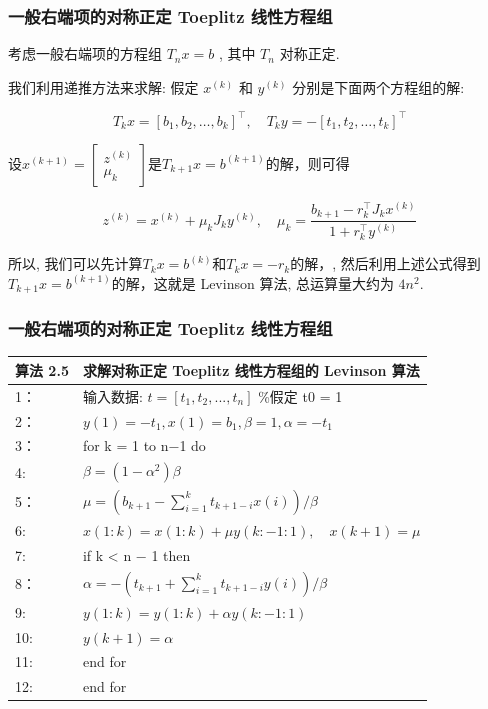 \documentclass[notheorems,serif]{beamer}
\begin{document}
\begin{frame}
\frametitle{一般右端项的对称正定 Toeplitz 线性方程组}
考虑一般右端项的方程组 $T_nx = b$ , 其中 $T_n$ 对称正定.

我们利用递推方法来求解: 假定 $x^{(k)}$ 和 $y^{(k)}$ 分别是下面两个方程组的解:

\begin{equation}
T_{k} x=\left[b_{1}, b_{2}, \ldots, b_{k}\right]^{\top}, \quad T_{k} y=-\left[t_{1}, t_{2}, \ldots, t_{k}\right]^{\top}
\end{equation}

设$x^{(k+1)}=\left[\begin{array}{c}{z^{(k)}} \\ {\mu_{k}}\end{array}\right]$是$T_{k+1} x=b^{(k+1)}$的解，则可得

\begin{equation}
z^{(k)}=x^{(k)}+\mu_{k} J_{k} y^{(k)}, \quad \mu_{k}=\frac{b_{k+1}-r_{k}^{\top} J_{k} x^{(k)}}{1+r_{k}^{\top} y^{(k)}}
\end{equation}

所以, 我们可以先计算$T_{k} x=b^{(k)}$和$T_{k} x=-r_{k}$的解，, 然后利用上述公式得到$T_{k+1} x=b^{(k+1)}$的解，这就是 Levinson 算法, 总运算量大约为 $4n^2$.
\end{frame}

\begin{frame}
\frametitle{一般右端项的对称正定 Toeplitz 线性方程组}
\begin{table}  
	\begin{tabular*}{16cm}{ll}  
		\hline  
		算法 2.5 &求解对称正定 Toeplitz 线性方程组的 Levinson 算法\\  
		\hline  
		1：   & 输入数据: $t = [t_1, t_2, . . . , t_n]$ \%假定 t0 = 1\\  
		2：   & $y(1) = −t_1, x(1) = b_1, \beta=1,\alpha = −t_1$\\
		3：   & for k = 1 to n−1 do \\
		4:    & \qquad $\beta=(1-\alpha^2)\beta$\\
		5：    & \qquad $\mu=\left(b_{k+1}-\sum_{i=1}^{k} t_{k+1-i} x(i)\right) / \beta$\\
		6:    & \qquad $x(1 : k)=x(1 : k)+\mu y(k :-1 : 1), \quad x(k+1)=\mu$\\
		7:    &\qquad if k < n − 1 then\\
		8：   & \qquad \qquad $\alpha=-\left(t_{k+1}+\sum_{i=1}^{k} t_{k+1-i} y(i)\right) / \beta$\\
		9:    &\qquad \qquad $y(1 : k)=y(1 : k)+\alpha y(k :-1 : 1)$\\
		10:   &\qquad \qquad $y(k + 1) = \alpha$\\
		11:   & \qquad end for \\
		12:   &end for\\
		\hline  
	\end{tabular*}  
\end{table}
\end{frame}
\end{document}
